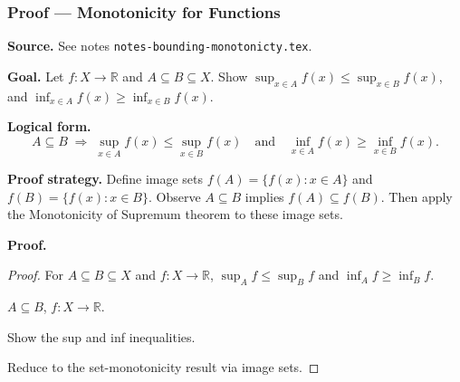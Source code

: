 
\clearpage
{}
\hypertarget{proof-RA-ABB-P-monotonicity-functions}{}

\subsubsection[Monotonicity for Functions]{Proof --- Monotonicity for Functions}

\bigskip

\noindent
\textbf{Source.}
See notes \texttt{notes-bounding-monotonicty.tex}.

\vspace{0.75em}

\noindent
\textbf{Goal.}
Let $f : X \to \mathbb{R}$ and $A \subseteq B \subseteq X$.
Show $\sup_{x \in A} f(x) \le \sup_{x \in B} f(x)$, and
$\inf_{x \in A} f(x) \ge \inf_{x \in B} f(x)$.

\vspace{0.75em}

\noindent
\textbf{Logical form.}
\[
  A \subseteq B
  \;\Rightarrow\;
  \sup_{x \in A} f(x) \le \sup_{x \in B} f(x)
  \quad\text{and}\quad
  \inf_{x \in A} f(x) \ge \inf_{x \in B} f(x).
\]

\vspace{0.75em}

\noindent
\textbf{Proof strategy.}
Define image sets $f(A) = \{f(x) : x \in A\}$ and $f(B) = \{f(x) : x \in B\}$.
Observe $A \subseteq B$ implies $f(A) \subseteq f(B)$. Then apply the
Monotonicity of Supremum theorem to these image sets.

\vspace{0.75em}

\noindent
\textbf{Proof.}
\begin{proof}
\Claim For $A \subseteq B \subseteq X$ and $f: X \to \mathbb{R}$,
$\sup_{A} f \le \sup_{B} f$ and $\inf_{A} f \ge \inf_{B} f$.

\Given $A \subseteq B$, $f : X \to \mathbb{R}$.

\Goal Show the sup and inf inequalities.

\Strategy Reduce to the set-monotonicity result via image sets.

\medskip



\end{proof}

